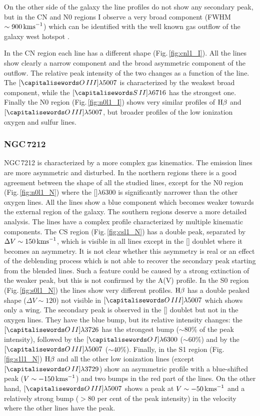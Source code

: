 \documentclass[../main.tex]{subfiles}
\begin{document}
On the other side of the galaxy the line profiles do not show any secondary peak, but in the CN and N0 regions I observe a very broad component (FWHM$\sim 900\,\si{\kms}$) which can be identified with the well known gas outflow of the galaxy west hotspot \citep[e.g.][]{Morganti07,Morganti15,Dasyra15}.

In the CN region each line has a different shape (Fig.\,\ref{fig:cnl1_I}).
All the lines show clearly a narrow component and the broad asymmetric component of the outflow.
The relative peak intensity of the two changes as a function of the line.
The $[\ion{O}{III}]\lambda5007$ is characterized by the weakest broad component, while the $[\ion{S}{II}]\lambda6716$ has the strongest one.
Finally the N0 region (Fig.\,\ref{fig:n0l1_I}) shows very similar profiles of $\Hb$ and $[\ion{O}{III}]\lambda5007$, but broader profiles of the low ionization oxygen and sulfur lines.


\subsubsection{NGC\,7212}
NGC\,7212 is characterized by a more complex gas kinematics.
The emission lines are more asymmetric and disturbed.
In the northern regions there is a good agreement between the shape of all the studied lines, except for the N0 region (Fig.\,\ref{fig:n0l1_N}) where the []$\lambda6300$ is significantly narrower than the other oxygen lines.
All the lines show a blue component which becomes weaker towards the external region of the galaxy.
The southern regions deserve a more detailed analysis.
The lines have a complex profile characterized by multiple kinematic components.
The CS region (Fig.\,\ref{fig:csl1_N}) has a double peak, separated by $\Delta V\sim 150\,\si{\kms}$, which is visible in all lines except in the [] doublet where it becomes an asymmetry.
It is not clear whether this asymmetry is real or an effect of the deblending process which is not able to recover the secondary peak starting from the blended lines.
Such a feature could be caused by a strong extinction of the weaker peak, but this is not confirmed by the A(V) profile.
In the S0 region (Fig.\,\ref{fig:s0l1_N}) the lines show very different profiles.
$\Hb$ has a double peaked shape ($\Delta V\sim 120$) not visible in $[\ion{O}{III}]\lambda5007$ which shows only a wing.
The secondary peak is observed in the [] doublet but not in the oxygen lines.
They have the blue bump, but its relative intensity changes: the $[\ion{O}{II}]\lambda3726$ has the strongest bump ($\sim80\%$ of the peak intensity), followed by the $[\ion{O}{I}]\lambda6300$ ($\sim60\%$) and by the $[\ion{O}{III}]\lambda5007$ ($\sim40\%$).
Finally, in the S1 region (Fig.\,\ref{fig:s1l1_N}) $\Hb$ and all the other low ionization lines (except $[\ion{O}{II}]\lambda3729$) show an asymmetric profile with a blue-shifted peak ($V\sim-150\,\si{\kms}$) and two bumps in the red part of the lines.
On the other hand, $[\ion{O}{III}]\lambda5007$ shows a peak at $V\sim -50\,\si{\kms}$ and a relatively strong bump ($>80$ per cent of the peak intensity) in the velocity where the other lines have the peak.
\end{document}
